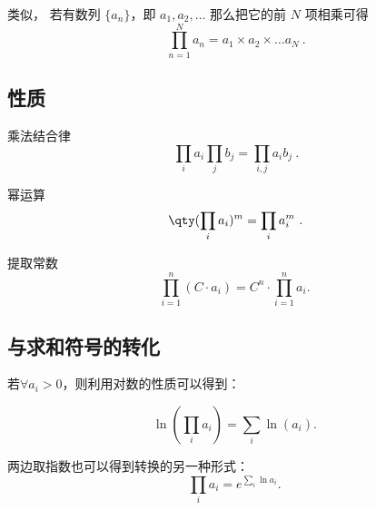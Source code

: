 
\begin{issues}
\issueDraft
\end{issues}

类似， 若有数列 $\{a_n\}$，即 $a_1, a_2, \dots$ 那么把它的前 $N$ 项相乘可得
\begin{equation}
\prod_{n = 1}^N a_n = a_1\times a_2\times \dots a_N~.
\end{equation}

\subsection{性质}

乘法结合律
\begin{equation}
\prod_i a_i \prod_j b_j =  \prod_{i,j} a_i b_j~.
\end{equation}

幂运算
\begin{equation}
\qty(\prod_i a_i)^m =  \prod_i a_i^m~.
\end{equation}

提取常数
\begin{equation}
\prod_{i=1}^n (C \cdot a_i) = C^n \cdot \prod_{i=1}^n a_i.~
\end{equation}

\subsection{与求和符号的转化}

若$\forall a_i > 0$，则利用对数的性质可以得到：

\begin{equation}
\ln \left( \prod_i a_i \right) = \sum_i \ln(a_i).~
\end{equation}

两边取指数也可以得到转换的另一种形式：
\begin{equation}
\prod_i a_i = e^{\displaystyle\sum_i \ln {a_i}}.~
\end{equation}


